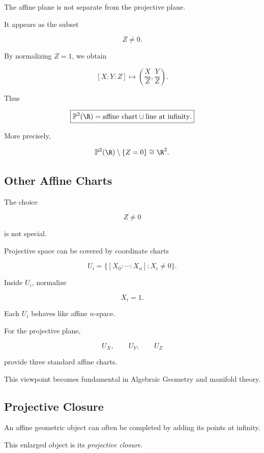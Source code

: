 The affine plane is not separate from the projective plane.

It appears as the subset

\[
Z\neq0.
\]

By normalizing \(Z=1\), we obtain

\[
[X:Y:Z]
\longmapsto
\left(\frac{X}{Z},\frac{Y}{Z}\right).
\]

Thus

\[
\boxed{
\mathbb{P}^{2}(\R)
=
\text{affine chart}
\cup
\text{line at infinity}.
}
\]

More precisely,

\[
\mathbb{P}^{2}(\R)\setminus\{Z=0\}
\cong
\R^2.
\]

\subsection{Other Affine Charts}
\label{subsec:other-affine-charts}

The choice

\[
Z\neq0
\]

is not special.

Projective space can be covered by coordinate charts

\[
U_i=\{[X_0:\cdots:X_n]:X_i\neq0\}.
\]

Inside \(U_i\), normalize

\[
X_i=1.
\]

Each \(U_i\) behaves like affine \(n\)-space.

For the projective plane,

\[
U_X,\qquad U_Y,\qquad U_Z
\]

provide three standard affine charts.

This viewpoint becomes fundamental in Algebraic Geometry and manifold
theory.

\subsection{Projective Closure}
\label{subsec:projective-closure}

An affine geometric object can often be completed by adding its points at
infinity.

This enlarged object is its \emph{projective closure}.


